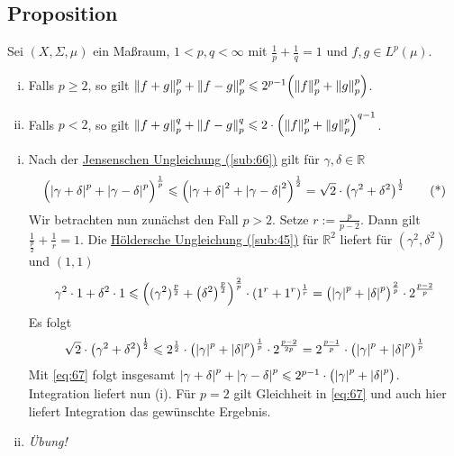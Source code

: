 \subsection[Proposition: Zwei Abschätzungen für die $p$-Norm in $L^p(\mu)$]{Proposition} %
\label{sub:67}
Sei $(X,\Sigma,\mu)$ ein Maßraum, $1 < p,q < \infty$ mit $\frac{1}{p} +\frac{1}{q}=1$ und $f,g \in L^p(\mu)$.
\begin{enumerate}[(i)]
	\item Falls $p\ge 2$, so gilt $\norm[p]{f+g}^p + \norm[p]{f-g}^p \le 2^{p-1} \enbrace*{\norm[p]{f}^p + \norm[p]{g}^p}$.
	\item Falls $p < 2$, so gilt $\norm[p]{f+g}^q + \norm[p]{f-g}^q \le 2 \cdot \enbrace*{\norm[p]{f}^p + \norm[p]{g}^p}^{q-1}$.
\end{enumerate}
\begin{enumerate}[(i)]
	\item Nach der \hyperref[sub:66]{Jensenschen Ungleichung (\ref*{sub:66})} gilt für $\gamma,\delta  \in \mathds{R}$
	\begin{equation*}
		\enbrace[\Big]{\abs*{\gamma+\delta }^p + \abs*{\gamma-\delta }^p}^{\frac{1}{p}} \le \enbrace*{\abs*{\gamma+\delta }^2 + \abs*{\gamma-\delta}^2}^{\frac{1}{2}}
		= \sqrt{2} \cdot \enbrace*{\gamma^2 + \delta^2}^{\frac{1}{2}} \label{eq:67} \tag{*}
	\end{equation*}
	Wir betrachten nun zunächst den Fall $p>2$. Setze $r := \frac{p}{p-2}$. Dann gilt $\frac{1}{\frac{p}{2}} + \frac{1}{r}=1$. Die \hyperref[sub:45]{Höldersche Ungleichung 
	(\ref*{sub:45})} für $\mathds{R}^2$ liefert für $(\gamma^2,\delta^2)$ und $(1,1)$
	\[
		\gamma^2 \cdot 1 + \delta^2 \cdot 1 \le \enbrace*{\enbrace{\gamma^2}^{\frac{p}{2} } + \enbrace*{\delta^2}^{\frac{p}{2}} }^{\frac{2}{p}} 
		\cdot (1^r+ 1^r)^{\frac{1}{r}} = \enbrace[\big]{\abs*{\gamma}^p + \abs*{\delta}^p}^{\frac{2}{p}} \cdot 2^{\frac{p-2}{p}} 
	\]
	Es folgt 
	\begin{align*}
		\sqrt{2} \cdot \enbrace*{\gamma^2+ \delta^2}^{\frac{1}{2}} \le 2^{\frac{1}{2}} \cdot \enbrace[\big]{\abs*{\gamma}^p + \abs*{\delta }^p}^{\frac{1}{p}} \cdot 2^{\frac{p-2}{2p} } = 2^{\frac{p-1}{p}} \cdot \enbrace[\big]{\abs*{\gamma}^p +\abs*{\delta}^p}^{\frac{1}{p} } 
	\end{align*}
	Mit \eqref{eq:67} folgt insgesamt $\abs*{\gamma+\delta}^p + \abs*{\gamma-\delta}^p \le 2^{p-1} \cdot  \enbrace[\big]{\abs*{\gamma}^p + \abs*{\delta}^p}$. 
	Integration liefert nun (i).
	Für $p=2$ gilt Gleichheit in \eqref{eq:67} und auch hier liefert Integration das gewünschte Ergebnis.
	\item \emph{Übung!} \bewende
\end{enumerate}

